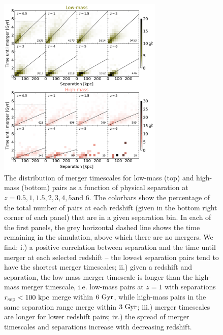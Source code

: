 \documentclass[twocolumn,linenumbers]{aastex631}
\begin{document}
\begin{figure}[htb!]
    \begin{center}
    \includegraphics[width=0.7\textwidth]{plots/bet-on-it/10_2Dhist_fits.png}
    \caption{The distribution of merger timescales for low-mass (top) and high-mass (bottom) pairs as a function of physical separation at $z=0.5,1,1.5,2,3,4,5\mbox{and }6$. 
    The colorbars show the percentage of the total number of pairs at each redshift (given in the bottom right corner of each panel) that are in a given separation bin.
    In each of the first panels, the grey horizontal dashed line shows the time remaining in the simulation, above which there are no mergers. 
    We find:
    i.) a positive correlation between separation and the time until merger at each selected redshift -- the lowest separation pairs tend to have the shortest merger timescales; 
    ii.) given a redshift and separation, the low-mass merger timescale is longer than the high-mass merger timescale, i.e. low-mass pairs at $z=1$ with separations $r_{\mathrm{sep}}<100\,\mathrm{\,kpc}$ merge within $6\, \mathrm{\,Gyr}$, while high-mass pairs in the same separation range merge within $3\, \mathrm{\,Gyr}$; 
    iii.) merger timescales are longer for lower redshift pairs; 
    iv.) the spread of merger timescales and separations increase with decreasing redshift. }
    \label{fig:2dhist}
    \end{center}
\end{figure}
\end{document}
